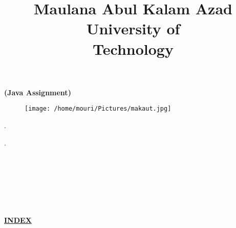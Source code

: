 \documentclass[a4paper,11pt]{article}
\begin{document}
\title{\textbf{\Huge Maulana Abul Kalam Azad University of\\[10pt] Technology}}
\date{\vspace{-5ex}}
\maketitle
\begin{center}
\textbf{\LARGE{(Java Assignment)}}
\end{center}
\begin{figure}[H]
\centering
\texttt{[image: /home/mouri/Pictures/makaut.jpg]}
\end{figure}
.
.
\\
\\
\\
\\
\\
\\
\\
\begin{center}
\LARGE\textbf{\underline{INDEX}}
\end{center}
\end{document}
